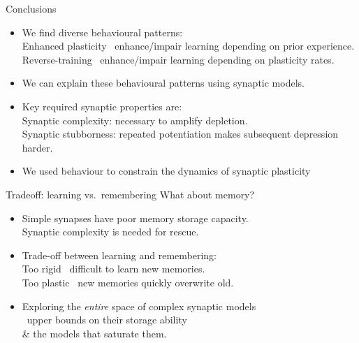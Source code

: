 \documentclass{beamer}%
\begin{document}
\begin{frame}{Conclusions}
%
 \begin{itemize}
   \item We find diverse behavioural patterns:\\

   \alert{Enhanced plasticity \lto\ enhance/impair} learning depending on prior experience.\\
   \alert{Reverse-training \lto\ enhance/impair} learning depending on plasticity rates.

   \item We can explain these behavioural patterns using synaptic models.

   \item Key required synaptic properties are:\\
   \alert{Synaptic complexity:} necessary to amplify depletion.\\
   \alert{Synaptic stubborness:} repeated potentiation makes subsequent depression harder.

   \item  We used behaviour to constrain the dynamics of synaptic plasticity
\end{itemize}
%
\end{frame}



\begin{frame}{Tradeoff: learning vs.\ remembering}
%
 What about memory?
 \begin{itemize}
   \vp\item Simple synapses have poor memory storage capacity. \\
   Synaptic complexity is needed for rescue.\\

   \vp\item Trade-off between learning and remembering:\\
   Too rigid \lto\ difficult to learn new memories.\\
   Too plastic \lto\ new memories quickly overwrite old.

   \vp\item Exploring the \emph{entire} space of complex synaptic models \\
   \lto\ upper bounds on their storage ability \\
   \& the models that saturate them.
 \end{itemize}

%
\end{frame}
\end{document}
